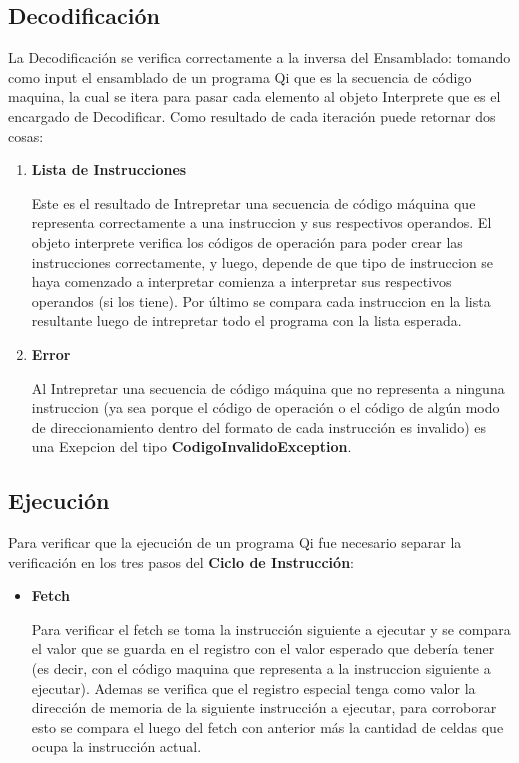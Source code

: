 \begin{enumerate}
\subsection{Decodificación}

La Decodificación se verifica correctamente a la inversa del Ensamblado: tomando como input el ensamblado de un programa Qi que es la secuencia de código maquina, la cual se itera para pasar cada elemento al objeto Interprete que es el encargado de Decodificar. Como resultado de cada iteración puede retornar dos cosas:
 
\begin{enumerate}
\item \textbf{Lista de Instrucciones} 

Este es el resultado de Intrepretar una secuencia de código máquina que representa correctamente a una instruccion y sus respectivos operandos. El objeto interprete verifica los códigos de operación para poder crear las instrucciones correctamente, y luego, depende de que tipo de instruccion se haya comenzado a interpretar comienza a interpretar sus respectivos operandos (si los tiene).
Por último se compara cada instruccion en la lista resultante luego de intrepretar todo el programa con la lista esperada.

\item\textbf{Error}

Al Intrepretar una secuencia de código máquina que no representa a ninguna instruccion (ya sea porque el código de operación o el código de algún modo de direccionamiento dentro del formato de cada instrucción es invalido) es una Exepcion del tipo \textbf{CodigoInvalidoException}.   
\end{enumerate}

\subsection{Ejecución}

Para verificar que la ejecución de un programa Qi fue necesario separar la verificación en los tres pasos del \textbf{Ciclo de Instrucción}:

\begin{itemize}
\item \textbf{Fetch} 

Para verificar el fetch se toma la instrucción siguiente a ejecutar y se compara el valor que se guarda en el registro \IR con el valor esperado que debería tener (es decir, con el código maquina que representa a la instruccion siguiente a ejecutar). Ademas se verifica que el registro especial \PC tenga como valor la dirección de memoria de la siguiente instrucción a ejecutar, para corroborar esto se compara el \PC luego del fetch con \PC anterior más la cantidad de celdas que ocupa la instrucción actual.


\end{itemize}
\end{enumerate}
